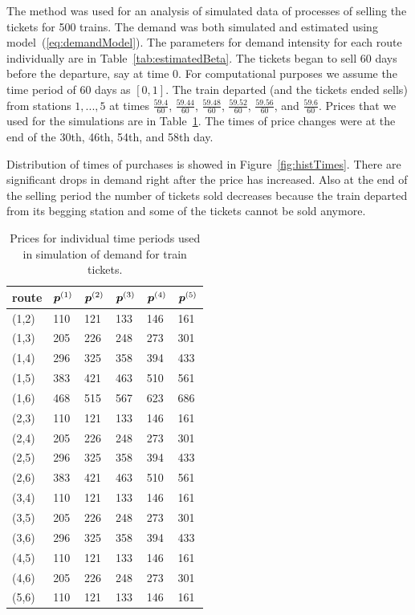 The method was used for an analysis of simulated data of processes of selling the tickets for 500 trains. The demand was both simulated and estimated using model~(\ref{eq:demandModel}). The parameters for demand intensity for each route individually are in Table~\ref{tab:estimatedBeta}. The tickets began to sell 60 days before the departure, say at time $0$. For computational purposes we assume the time period of 60 days as $[0,1]$. The train departed (and the tickets ended sells) from stations $1, ..., 5$ at times $\frac{59.4}{60}$, $\frac{59.44}{60}$, $\frac{59.48}{60}$, $\frac{59.52}{60}$, $\frac{59.56}{60}$, and $\frac{59.6}{60}$. Prices that we used for the simulations are in Table~\ref{tab:ticketPrices}. The times of price changes were at the end of the 30th, 46th, 54th, and 58th day.

Distribution of times of purchases is showed in Figure~\ref{fig:histTimes}. There are significant drops in demand right after the price has increased. Also at the end of the selling period the number of tickets sold decreases because the train departed from its begging station and some of the tickets cannot be sold anymore.

\begin{table}[ht]
	\centering
	\begin{tabular}{llllll}
		\hline
		route & $\bm{p}^{(1)}$ & $\bm{p}^{(2)}$ & $\bm{p}^{(3)}$ & $\bm{p}^{(4)}$ & $\bm{p}^{(5)}$ \\ 
		\hline
		(1,2) & 110 & 121 & 133 & 146 & 161 \\ 
		(1,3) & 205 & 226 & 248 & 273 & 301 \\ 
		(1,4) & 296 & 325 & 358 & 394 & 433 \\ 
		(1,5) & 383 & 421 & 463 & 510 & 561 \\ 
		(1,6) & 468 & 515 & 567 & 623 & 686 \\ 
		(2,3) & 110 & 121 & 133 & 146 & 161 \\ 
		(2,4) & 205 & 226 & 248 & 273 & 301 \\ 
		(2,5) & 296 & 325 & 358 & 394 & 433 \\ 
		(2,6) & 383 & 421 & 463 & 510 & 561 \\ 
		(3,4) & 110 & 121 & 133 & 146 & 161 \\ 
		(3,5) & 205 & 226 & 248 & 273 & 301 \\ 
		(3,6) & 296 & 325 & 358 & 394 & 433 \\ 
		(4,5) & 110 & 121 & 133 & 146 & 161 \\ 
		(4,6) & 205 & 226 & 248 & 273 & 301 \\ 
		(5,6) & 110 & 121 & 133 & 146 & 161 \\ 
		 \hline
	\end{tabular}
	\caption{Prices for individual time periods used in simulation of demand for train tickets.}
	\label{tab:ticketPrices}
\end{table}


